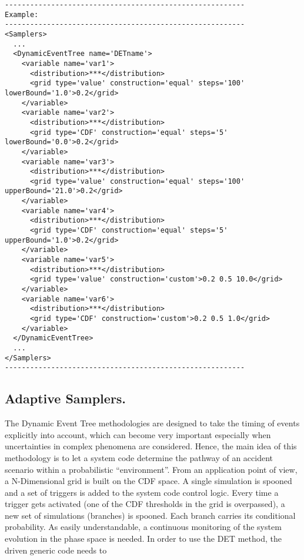 \begin{lstlisting}[style=XML]
---------------------------------------------------------
Example:
---------------------------------------------------------
<Samplers>
  ...
  <DynamicEventTree name='DETname'> 
    <variable name='var1'> 
      <distribution>***</distribution>
      <grid	type='value' construction='equal' steps='100' lowerBound='1.0'>0.2</grid>	
    </variable> 
    <variable name='var2'> 
      <distribution>***</distribution>
      <grid	type='CDF' construction='equal' steps='5' lowerBound='0.0'>0.2</grid>	
    </variable>
    <variable name='var3'> 
      <distribution>***</distribution>
      <grid	type='value' construction='equal' steps='100' upperBound='21.0'>0.2</grid>	
    </variable> 
    <variable name='var4'> 
      <distribution>***</distribution>
      <grid	type='CDF' construction='equal' steps='5' upperBound='1.0'>0.2</grid>	
    </variable>
    <variable name='var5'> 
      <distribution>***</distribution>
      <grid	type='value' construction='custom'>0.2 0.5 10.0</grid>	
    </variable> 
    <variable name='var6'> 
      <distribution>***</distribution>
      <grid	type='CDF' construction='custom'>0.2 0.5 1.0</grid>	
    </variable>
  </DynamicEventTree>
  ...
</Samplers>
---------------------------------------------------------
\end{lstlisting}



\subsection{Adaptive Samplers.}
\label{subsec:AdaptSamplers}
The Dynamic Event Tree methodologies are designed to take the timing of events explicitly into account, which can become very important especially when uncertainties in complex phenomena are considered. Hence, the main idea of this methodology is to let a system code determine the pathway of an accident scenario within a probabilistic “environment”. 
From an application point of view, a N-Dimensional grid is built on the CDF space. A single simulation is spooned and a set of triggers is added to the system code control logic. Every time a trigger gets activated (one of the CDF thresholds in the grid is overpassed), a new set of simulations (branches) is spooned. Each branch carries its conditional probability. 
As easily understandable, a continuous monitoring of the system evolution in the phase space is needed.  In order to use the DET method, the driven generic code needs to 

